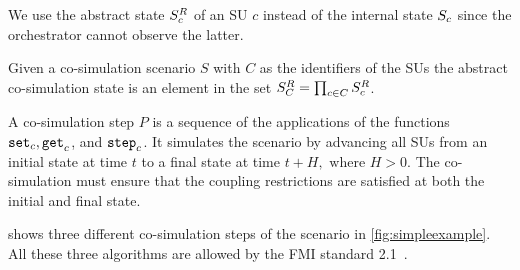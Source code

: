 We use the abstract state $S^{R}_{c}$ of an SU $c$ instead of the internal state $S_{c}$ since the orchestrator cannot observe the latter.

\begin{definition}\label{def:cosimstate}
  Given a co-simulation scenario $S$ with $C$ as the identifiers of the SUs the abstract co-simulation state is an element in the set $S^{R}_{C} = \prod_{c \in C} S^{R}_{c}$. 
\end{definition}

A co-simulation step $P$ is a sequence of the applications of the functions $\mathtt{set}_{c},\mathtt{get}_{c}$, and $\mathtt{step}_{c}$.
It simulates the scenario by advancing all SUs from an initial state at time $t$ to a final state at time $t+H, \textrm{ where } H > 0$.
The co-simulation must ensure that the coupling restrictions are satisfied at both the initial and final state.

 shows three different co-simulation steps of the scenario in \cref{fig:simpleexample}.
All these three algorithms are allowed by the FMI standard 2.1~\cite{FMI2014}. 


